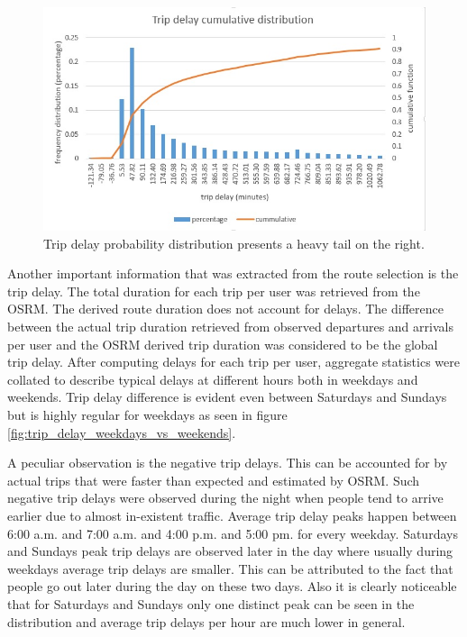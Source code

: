 \documentclass[12pt, a4paper]{report}
\theoremstyle{definition}
\theoremstyle{definition}%
\theoremstyle{definition}%
\theoremstyle{definition}%
\theoremstyle{definition}%
\theoremstyle{definition}%
\begin{document}
\begin{figure}[!]	
	\includegraphics[scale=0.60]{trip_delay_cumm_distribution_total.jpg}
	\centering
	\caption[Trip delay total cumulative distribution]{Trip delay probability distribution presents a heavy tail on the right.  }
	\label{fig:trip_delay_cum_distribution_heavy_tail}
\end{figure}

Another important information that was extracted from the route selection is the trip delay. The total duration for each trip per user was retrieved from the OSRM. The derived route duration does not account for delays. The difference between the actual trip duration retrieved from observed departures and arrivals per user and the OSRM derived trip duration was considered to be the global trip delay. After computing delays for each trip per user, aggregate statistics were collated to describe typical delays at different hours both in weekdays and weekends. Trip delay difference is evident even between Saturdays and Sundays but is highly regular for weekdays as seen in figure  \ref{fig:trip_delay_weekdays_vs_weekends}. 

A peculiar observation is the negative trip delays. This can be accounted for by actual trips that were faster than expected and estimated by OSRM. Such negative trip delays were observed during the night when people tend to arrive earlier due to almost in-existent traffic. Average trip delay peaks happen between 6:00 a.m. and 7:00 a.m. and 4:00 p.m. and 5:00 pm. for every weekday. Saturdays and Sundays peak trip delays are observed later in the day where usually during weekdays average trip delays are smaller. This can be attributed to the fact that people go out later during the day on these two days. Also it is clearly noticeable that for Saturdays and Sundays only one distinct peak can be seen in the distribution and average trip delays per hour are much lower in general.
\end{document}
